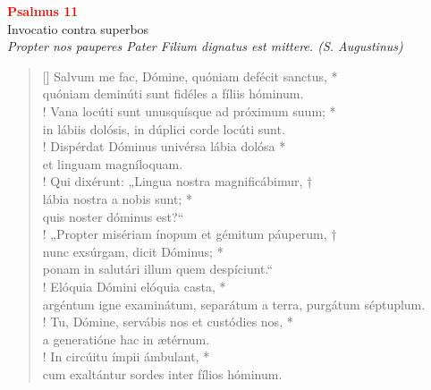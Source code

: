 


\def\greinitialformat#1{%
{\fontsize{39}{39}\selectfont #1}%
}




\vspace{0.3cm}
\begin{center}
 \textcolor{red}{\large \bf Psalmus 11}\\
Invocatio contra superbos\\
\textit{\small Propter nos pauperes Pater Filium dignatus est mittere. (S. Augustinus)}
\end{center}
\begin{verse}[\versewidth]
Salvum me fac, Dómine,	quóniam defécit sanctus, *\\
quóniam deminúti sunt fidéles a fíliis hóminum.\\!
\vin Vana locúti sunt unusquísque ad próximum suum; *\\
\vin in lábiis dolósis, in dúplici corde locúti sunt.\\!
Dispérdat Dóminus univérsa lábia dolósa *\\
et linguam magníloquam.\\!
\vin Qui dixérunt: „Lingua nostra magnificábimur, †\\
\vin lábia nostra a nobis sunt; *\\
\vin quis noster dóminus est?“\\!
„Propter misériam ínopum et gémitum páuperum, †\\
nunc exsúrgam, dicit Dóminus; *\\
ponam in salutári illum quem despíciunt.“\\!
\vin Elóquia Dómini elóquia casta, *\\
\vin argéntum igne examinátum, \verselinebreak separátum a terra, purgátum séptuplum.\\!
Tu, Dómine, servábis nos et custódies nos, *\\
a generatióne hac in ætérnum.\\!
\vin In circúitu ímpii ámbulant, *\\
\vin cum exaltántur sordes inter fílios hóminum.\\
\end{verse}
\vspace{1cm}


